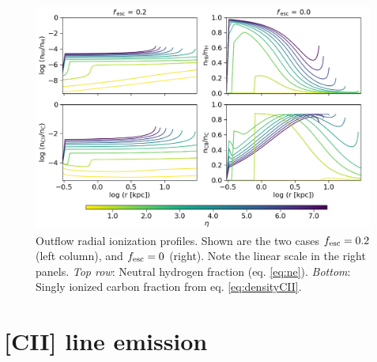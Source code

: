 \begin{figure}[t]
    \centering
    \includegraphics[width=1.0\textwidth]{plots/ions.png}
    \caption{Outflow radial ionization profiles. Shown are the two cases $f_{\rm esc}=0.2$ (left column), and $f_{\rm esc}=0$ (right). Note the linear scale in the right panels.
    \textit{Top row}: Neutral hydrogen fraction (eq. \ref{eq:ne}). \textit{Bottom}: Singly ionized carbon fraction from eq. \ref{eq:densityCII}.
    \label{fig:global_ionization}
    }
\end{figure}


\section{[CII] line emission}\label{sec:CII_emission}



